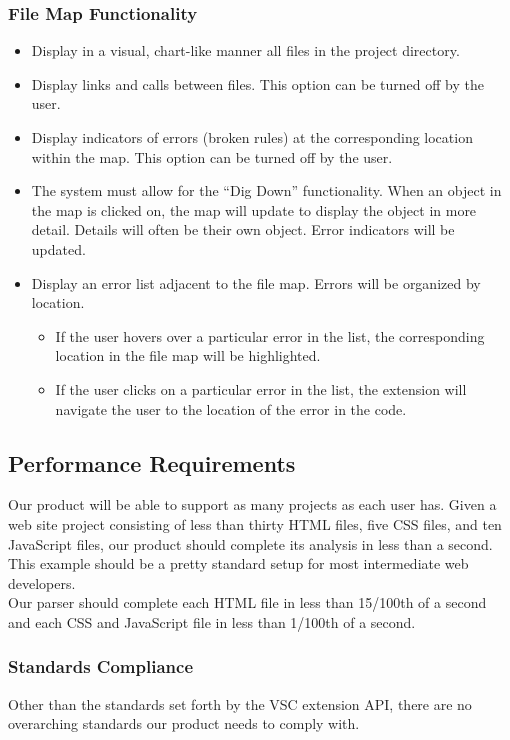 \documentclass[letterpaper,10pt,titlepage,draftclsnofoot,onecolumn] {IEEEtran}
\begin{document}
\subsubsection{File Map Functionality}
\begin{itemize}
	\item Display in a visual, chart-like manner all files in the project directory.
    \item Display links and calls between files. This option can be turned off by the user.
    \item Display indicators of errors (broken rules) at the corresponding location within the map. This option can be turned off by the user.
    \item The system must allow for the “Dig Down” functionality. When an object in the map is clicked on, the map will update to display the object in more detail. Details will often be their own object. Error indicators will be updated.
    \item Display an error list adjacent to the file map. Errors will be organized by location.
    \begin{itemize}
    	\item If the user hovers over a particular error in the list, the corresponding location in the file map will be 	highlighted.
        \item If the user clicks on a particular error in the list, the extension will navigate the user to the location of the error in the code.
    \end{itemize}
\end{itemize}

\subsection{Performance Requirements}
Our product will be able to support as many projects as each user has. 
Given a web site project consisting of less than thirty HTML files, five CSS files, and ten JavaScript files, our product should complete its analysis in less than a second. 
This example should be a pretty standard setup for most intermediate web developers.
\\
Our parser should complete each HTML file in less than 15/100th of a second and each CSS and JavaScript file in less than 1/100th of a second.

\subsubsection{Standards Compliance}
Other than the standards set forth by the VSC extension API, there are no overarching standards our product needs to comply with.
\end{document}
